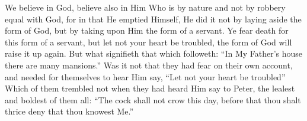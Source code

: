 We believe in God, believe also in Him Who is by nature and not by robbery equal with God, for in that He emptied Himself, He did it not by laying aside the form of God, but by taking upon Him the form of a servant. Ye fear death for this form of a servant, but let not your heart be troubled, the form of God will raise it up again. But what signifieth that which followeth: “In My Father’s house there are many mansions.” Was it not that they had fear on their own account, and needed for themselves to hear Him say, “Let not your heart be troubled” Which of them trembled not when they had heard Him say to Peter, the lealest and boldest of them all: “The cock shall not crow this day, before that thou shalt thrice deny that thou knowest Me.”

